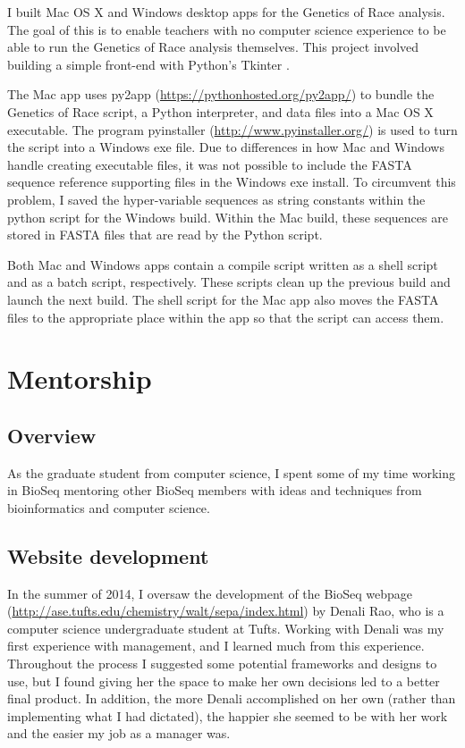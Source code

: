 \documentclass{report}
\begin{document}
I built Mac OS X and Windows desktop apps for the Genetics of Race analysis. The goal of this is to enable teachers with no computer science experience to be able to run the Genetics of Race analysis themselves. This project involved building a simple front-end with Python's Tkinter \cite{shipman2005tkinter}. 

The Mac app uses py2app (\url{https://pythonhosted.org/py2app/}) to bundle the Genetics of Race script, a Python interpreter, and data files into a Mac OS X executable. The program pyinstaller (\url{http://www.pyinstaller.org/}) is used to turn the script into a Windows exe file. Due to differences in how Mac and Windows handle creating executable files, it was not possible to include the FASTA sequence reference supporting files in the Windows exe install. To circumvent this problem, I saved the hyper-variable sequences as string constants within the python script for the Windows build. Within the Mac build, these sequences are stored in FASTA files that are read by the Python script. 

Both Mac and Windows apps contain a compile script written as a shell script and as a batch script, respectively. These scripts clean up the previous build and launch the next build. The shell script for the Mac app also moves the FASTA files to the appropriate place within the app so that the script can access them.


\chapter{Mentorship}
\section{Overview}
As the graduate student from computer science, I spent some of my time working in BioSeq mentoring other BioSeq members with ideas and techniques from  bioinformatics and computer science. 

\section{Website development}
In the summer of 2014, I oversaw the development of the BioSeq webpage (\url{http://ase.tufts.edu/chemistry/walt/sepa/index.html}) by Denali Rao, who is a computer science undergraduate student at Tufts. Working with Denali was my first experience with management, and I learned much from this experience. Throughout the process I suggested some potential frameworks and designs to use, but I found giving her the space to make her own decisions led to a better final product. In addition, the more Denali accomplished on her own (rather than implementing what I had dictated), the happier she seemed to be with her work and the easier my job as a manager was.
\end{document}

